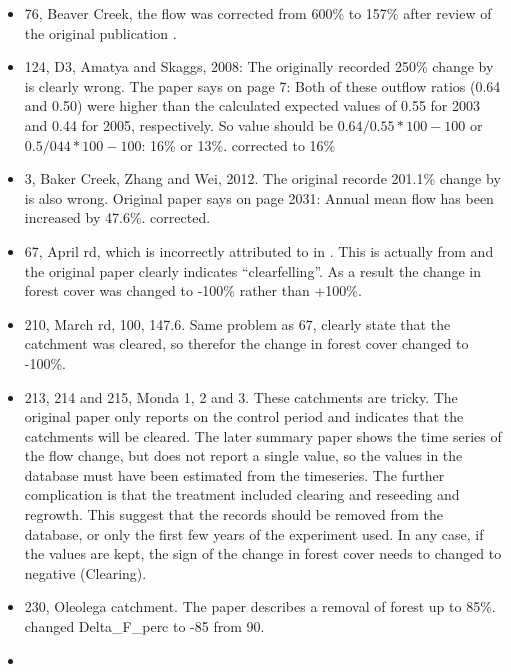 \documentclass[]{elsarticle} %
\providecommand{\tightlist}{%
  \setlength{\itemsep}{0pt}\setlength{\parskip}{0pt}}
\begin{document}
\begin{itemize}
\tightlist
\item
  76, Beaver Creek, the flow was corrected from 600\% to 157\% after review of the original publication \citep{baker1984}.
\item
  124, D3, Amatya and Skaggs, 2008: The originally recorded 250\% change by \citet{zhang2017} is clearly wrong. The paper says on page 7: Both of these outflow ratios (0.64 and 0.50) were higher than the calculated expected values of 0.55 for 2003 and 0.44 for 2005, respectively. So value should be \(0.64/0.55*100 - 100\) or \(0.5/044*100 - 100\): 16\% or 13\%. corrected to 16\%
\item
  3, Baker Creek, Zhang and Wei, 2012. The original recorde 201.1\% change by \citet{zhang2017} is also wrong. Original paper says on page 2031: Annual mean flow has been increased by 47.6\%. corrected.\\
\item
  67, April rd, which is incorrectly attributed to \citet{ruprecht1991} in \citet{zhang2017}. This is actually from \citet{ruprecht1989} and the original paper clearly indicates ``clearfelling''. As a result the change in forest cover was changed to -100\% rather than +100\%.\\
\item
  210, March rd, 100, 147.6. Same problem as 67, \citet{bari1996} clearly state that the catchment was cleared, so therefor the change in forest cover changed to -100\%.\\
\item
  213, 214 and 215, Monda 1, 2 and 3. These catchments are tricky. The original paper \citep{oshaughnessy1979} only reports on the control period and indicates that the catchments will be cleared. The later summary paper \citep{watson2001} shows the time series of the flow change, but does not report a single value, so the values in the database must have been estimated from the timeseries. The further complication is that the treatment included clearing and reseeding and regrowth. This suggest that the records should be removed from the database, or only the first few years of the experiment used. In any case, if the values are kept, the sign of the change in forest cover needs to changed to negative (Clearing).\\
\item
  230, Oleolega catchment. The paper describes a removal of forest up to 85\%. changed Delta\_F\_perc to -85 from 90.\\
\item

\end{itemize}
\end{document}
